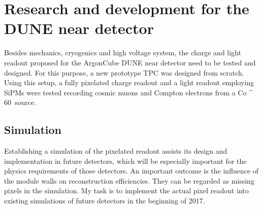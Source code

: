 \chapter{Research and development for the DUNE near detector\label{chap:rd-dune-nd}}

Besides mechanics, cryogenics and high voltage system, the charge and light readout proposed for the ArgonCube DUNE near detector need to be tested and designed.
For this purpose, a new prototype TPC was designed from scratch.
Using this setup, a fully pixelated charge readout and a light readout employing SiPMs were tested recording cosmic muons and Compton electrons from a \si{Co ^ {60}} source.


\section{Simulation\label{sec:rd-dune-nd_simulation}}

Establishing a simulation of the pixelated readout assists its design and implementation in future detectors, which will be especially important for the physics requirements of those detectors.
An important outcome is the influence of the module walls on reconstruction efficiencies.
They can be regarded as missing pixels in the simulation.
My task is to implement the actual pixel readout into existing simulations of future detectors in the beginning of 2017.
